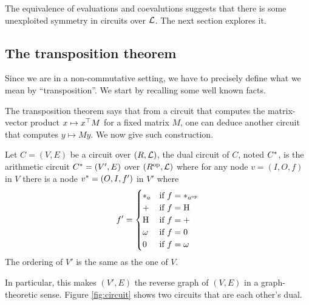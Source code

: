 The equivalence of evaluations and coevalutions suggests that there is
some unexploited symmetry in circuits over $\mathcal{L}$. The next
section explores it.


\subsection{The transposition theorem}
\label{sec:tellegen}

Since we are in a non-commutative setting, we have to precisely define
what we mean by ``transposition''. We start by recalling some well
known facts.


The transposition theorem says that from a circuit that computes the
matrix-vector product $x\mapsto x^\top M$ for a fixed matrix $M$, one can
deduce another circuit that computes $y\mapsto My$. We now
give such construction.

\begin{definition}
  \label{def:dual}
  Let $C=(V,E)$ be a circuit over $(R,\mathcal{L})$, the dual circuit of
  $C$, noted $C^\ast$, is the arithmetic circuit $C^\ast = (V',
  E)$ over $(R^{\mathrm{op}},\mathcal{L})$ where for any node $v=(I,O,f)$ in $V$
  there is a node $v^\ast=(O,I,f')$ in $V'$ where
  \begin{equation}
    \label{eq:dual-circuit}
    f' = \begin{cases}
      *_{a} & \text{if $f = *_{a^{\mathrm{op}}}$}\\
      + & \text{if $f = \operatorname{H}$}\\
      \operatorname{H} & \text{if $f = +$}\\
      \omega & \text{if $f = 0$}\\
      0 & \text{if $f = \omega$}
    \end{cases}
  \end{equation}
  The ordering of $V'$ is the same as the one of $V$.
\end{definition}

In particular, this makes $(V',E)$ the reverse graph of $(V,E)$ in a
graph-theoretic sense. Figure \ref{fig:circuit} shows two circuits
that are each other's dual.

